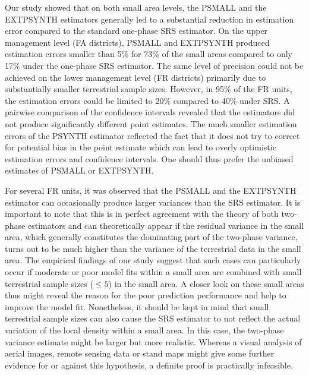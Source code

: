 \documentclass[remotesensing,article,submit,moreauthors,pdftex,10pt,a4paper]{mdpi}
\newcommand{\psynth}{PSYNTH}
\newcommand{\psmall}{PSMALL}
\newcommand{\extpsynth}{EXTPSYNTH}
\begin{document}
Our study showed that on both small area levels, the \psmall{} and the \extpsynth{} estimators generally led to a substantial reduction in estimation error compared to the standard one-phase SRS estimator. On the upper management level (FA districts), \psmall{} and \extpsynth{} produced estimation errors smaller than 5\% for 73\% of the small areas compared to only 17\% under the one-phase SRS estimator. The same level of precision could not be achieved on the lower management level (FR districts) primarily due to substantially smaller terrestrial sample sizes. However, in 95\% of the FR units, the estimation errors could be limited to 20\% compared to 40\% under SRS. A pairwise comparison of the confidence intervals revealed that the estimators did not produce significantly different point estimates. The much smaller estimation errors of the \psynth{} estimator reflected the fact that it does not try to correct for potential bias in the point estimate which can lead to overly optimistic estimation errors and confidence intervals. One should thus prefer the unbiased estimates of \psmall{} or \extpsynth{}.\par

For several FR units, it was observed that the \psmall{} and the \extpsynth{} estimator can occasionally produce larger variances than the SRS estimator. It is important to note that this is in perfect agreement with the theory of both two-phase estimators and can theoretically appear if the residual variance in the small area, which generally constitutes the dominating part of the two-phase variance, turns out to be much higher than the variance of the terrestrial data in the small area. The empirical findings of our study suggest that such cases can particularly occur if moderate or poor model fits within a small area are combined with small terrestrial sample sizes ($\leq 5$) in the small area. A closer look on these small areas thus might reveal the reason for the poor prediction performance and help to improve the model fit. Nonetheless, it should be kept in mind that small terrestrial sample sizes can also cause the SRS estimator to not reflect the actual variation of the local density within a small area. In this case, the two-phase variance estimate might be larger but more realistic. Whereas a visual analysis of aerial images, remote sensing data or stand maps might give some further evidence for or against this hypothesis, a definite proof is practically infeasible.\par
\end{document}

